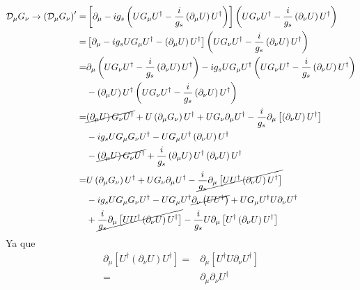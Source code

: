 \begin{align}
 \mathcal{D}_{\mu} G_{\nu}\to   \left(   \mathcal{D}_{\mu} G_{\nu} \right)' =&
\left[\partial_{\mu}-i g_s\left(U G_\mu U^{\dagger}-\frac{i}{g_s}\left(\partial_\mu U\right)U^\dagger  \right)   \right] \left(U G_\nu U^{\dagger}-\frac{i}{g_s}\left(\partial_\nu U\right)U^\dagger  \right) \nonumber\\
=&
\left[\partial_{\mu}-i g_sU G_\mu U^{\dagger}-\left(\partial_\mu U\right)U^\dagger   \right] \left(U G_\nu U^{\dagger}-\frac{i}{g_s}\left(\partial_\nu U\right)U^\dagger  \right) \nonumber\\
=&
\partial_{\mu} \left(U G_\nu U^{\dagger}-\frac{i}{g_s}\left(\partial_\nu U\right)U^\dagger  \right)
-i g_sU G_\mu U^{\dagger}\left(U G_\nu U^{\dagger}-\frac{i}{g_s}\left(\partial_\nu U\right)U^\dagger  \right)
\nonumber\\
&-\left(\partial_\mu U\right)U^\dagger\left(U G_\nu U^{\dagger}-\frac{i}{g_s}\left(\partial_\nu U\right)U^\dagger  \right) \nonumber\\
  =& \cancel{\left(\partial_{\mu} U \right) G_\nu U^{\dagger}} + U
  \left( \partial_{\mu}G_\nu \right) U^{\dagger} + U
  G_{\nu} \partial_{\mu} U^{\dagger} -\frac{i}{g_s}\partial_{\mu}
  \left[ \left( \partial_{\nu}U \right)U^{\dagger} \right]
  \nonumber\\
  &-i g_s U G_{\mu}G_{\nu}U^{\dagger}- UG_{\mu} U^{\dagger} \left( \partial_{\nu} U\right)U^{\dagger} \nonumber\\
  &-\cancel{\left( \partial_{\mu}U \right)G_{\nu} U^{\dagger}}
  +\frac{i}{g_s} \left( \partial_{\mu}U \right) U^{\dagger} \left( \partial_{\nu}U \right) U^{\dagger} \nonumber\\
  =& U \left( \partial_{\mu}G_\nu \right) U^{\dagger} + U
  G_{\nu} \partial_{\mu} U^{\dagger}
  -\cancel{\frac{i}{g_s}\partial_{\mu} \left[ U
      U^{\dagger}\left( \partial_{\nu}U \right)U^{\dagger} \right]}
  \nonumber\\
  &-i g_s U G_{\mu}G_{\nu}U^{\dagger}- UG_{\mu}
  U^{\dagger}\cancel{ \partial_{\nu}\left( UU^{\dagger} \right)}+
  UG_{\mu} U^{\dagger} U\partial_{\nu}U^{\dagger}
  \nonumber\\
  &+\cancel{\frac{i}{g_s} \partial_{\mu} \left[ U U^{\dagger}
      \left( \partial_{\nu}U \right) U^{\dagger}\right]}-
  \frac{i}{g_s} U \partial_{\mu} \left[ U^{\dagger}
    \left( \partial_{\nu}U \right) U^{\dagger}\right]
\end{align}
Ya que
\begin{align}
 \partial_{\mu} \left[ U^{\dagger}
    \left( \partial_{\nu}U \right) U^{\dagger}\right]=&
 \partial_{\mu} \left[ U^{\dagger} U \partial_{\nu} U^{\dagger}\right] \nonumber\\
=& \partial_{\mu}  \partial_{\nu} U^{\dagger} \nonumber\\
\end{align}
